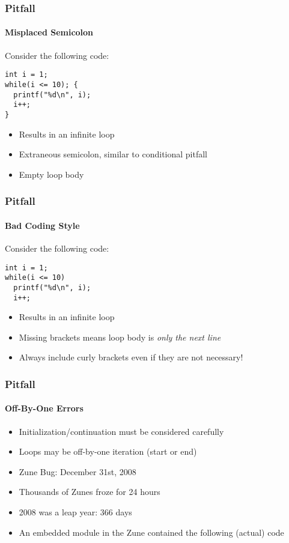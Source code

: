 \documentclass[]{beamer}
\begin{document}
\begin{frame}[fragile]
  \frametitle{Pitfall}
  \framesubtitle{Misplaced Semicolon}

Consider the following code:
\begin{verbatim}
int i = 1;
while(i <= 10); {
  printf("%d\n", i);
  i++;
}
\end{verbatim}

\begin{itemize}[<+(1)->]
  \item Results in an infinite loop
  \item Extraneous semicolon, similar to conditional pitfall
  \item Empty loop body
\end{itemize}

\end{frame}


\begin{frame}[fragile]
  \frametitle{Pitfall}
  \framesubtitle{Bad Coding Style}
  
Consider the following code:
\begin{verbatim}
int i = 1;
while(i <= 10)
  printf("%d\n", i);
  i++;
\end{verbatim}

\begin{itemize}[<+(1)->]
  \item Results in an infinite loop
  \item Missing brackets means loop body is \emph{only the next line}
  \item Always include curly brackets even if they are not necessary!
\end{itemize}

\end{frame}


\begin{frame}[fragile]
  \frametitle{Pitfall}
  \framesubtitle{Off-By-One Errors}

\begin{itemize}[<+->]
  \item Initialization/continuation must be considered carefully
  \item Loops may be off-by-one iteration (start or end)
  \item Zune Bug: December 31st, 2008
  \item Thousands of Zunes froze for 24 hours
  \item 2008 was a leap year: 366 days
  \item An embedded module in the Zune contained the following
          (actual) code
\end{itemize}

\end{frame}
\end{document}
